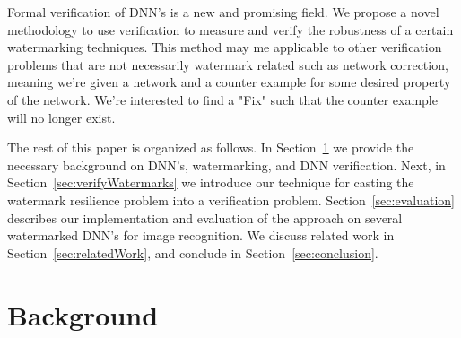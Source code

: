 \documentclass[a4paper]{easychair}
\begin{document}
Formal verification of DNN's is a new and promising field. We propose a novel methodology to use verification to measure and verify the robustness of a certain watermarking techniques. This method may me applicable to other verification problems that are not necessarily watermark related such as network correction, meaning we're given a network and a counter example for some desired property of the network. We're interested to find a "Fix" such that the counter example will no longer exist.

The rest of this paper is organized as follows. In
Section~\ref{sec:background} we provide the necessary background on DNN's, watermarking, and DNN verification. Next, in
Section~\ref{sec:verifyWatermarks} we introduce our technique for
casting the watermark resilience problem into a verification
problem. Section~\ref{sec:evaluation} describes our implementation and evaluation of the approach on several watermarked DNN's for image
recognition. We discuss related work in Section~\ref{sec:relatedWork},
and conclude in Section~\ref{sec:conclusion}.

\section{Background}
\label{sec:background}
\end{document}
